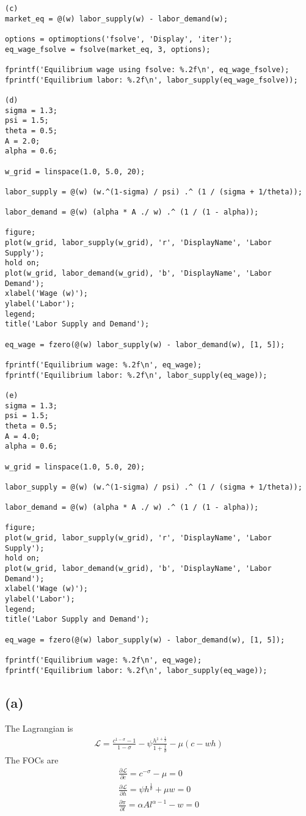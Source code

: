 \documentclass[a4paper]{article}
\begin{document}
\begin{verbatim}
(c)
market_eq = @(w) labor_supply(w) - labor_demand(w);

options = optimoptions('fsolve', 'Display', 'iter');
eq_wage_fsolve = fsolve(market_eq, 3, options);

fprintf('Equilibrium wage using fsolve: %.2f\n', eq_wage_fsolve);
fprintf('Equilibrium labor: %.2f\n', labor_supply(eq_wage_fsolve));

(d)
sigma = 1.3;
psi = 1.5;
theta = 0.5;
A = 2.0;
alpha = 0.6;

w_grid = linspace(1.0, 5.0, 20);

labor_supply = @(w) (w.^(1-sigma) / psi) .^ (1 / (sigma + 1/theta));

labor_demand = @(w) (alpha * A ./ w) .^ (1 / (1 - alpha));

figure;
plot(w_grid, labor_supply(w_grid), 'r', 'DisplayName', 'Labor Supply');
hold on;
plot(w_grid, labor_demand(w_grid), 'b', 'DisplayName', 'Labor Demand');
xlabel('Wage (w)');
ylabel('Labor');
legend;
title('Labor Supply and Demand');

eq_wage = fzero(@(w) labor_supply(w) - labor_demand(w), [1, 5]);

fprintf('Equilibrium wage: %.2f\n', eq_wage);
fprintf('Equilibrium labor: %.2f\n', labor_supply(eq_wage));

(e)
sigma = 1.3;
psi = 1.5;
theta = 0.5;
A = 4.0;
alpha = 0.6;

w_grid = linspace(1.0, 5.0, 20);

labor_supply = @(w) (w.^(1-sigma) / psi) .^ (1 / (sigma + 1/theta));

labor_demand = @(w) (alpha * A ./ w) .^ (1 / (1 - alpha));

figure;
plot(w_grid, labor_supply(w_grid), 'r', 'DisplayName', 'Labor Supply');
hold on;
plot(w_grid, labor_demand(w_grid), 'b', 'DisplayName', 'Labor Demand');
xlabel('Wage (w)');
ylabel('Labor');
legend;
title('Labor Supply and Demand');

eq_wage = fzero(@(w) labor_supply(w) - labor_demand(w), [1, 5]);

fprintf('Equilibrium wage: %.2f\n', eq_wage);
fprintf('Equilibrium labor: %.2f\n', labor_supply(eq_wage));
\end{verbatim}

\subsection*{(a)}
The Lagrangian is
\begin{gather*}
    \mathcal{L} = \frac{c^{1-\sigma} - 1}{1 - \sigma} - \psi \frac{h^{1 + \frac{1}{\theta}}}{1 + \frac{1}{\theta}} - \mu(c - wh)
\end{gather*}
The FOCs are
\begin{align*}
    \frac{\partial \mathcal{L}}{\partial c} = c^{-\sigma} - \mu = 0\\
    \frac{\partial \mathcal{L}}{\partial h} = \psi h^{\frac{1}{\theta}} + \mu w = 0\\
    \frac{\partial \pi}{\partial l} = \alpha A l^{\alpha - 1} - w = 0
\end{align*}
\end{document}
